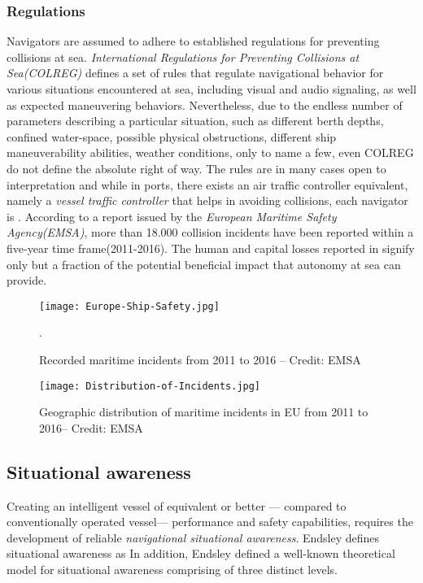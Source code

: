 \subsubsection{Regulations}
Navigators are assumed to adhere to established regulations for preventing collisions at sea. \emph{International Regulations for Preventing Collisions at Sea(COLREG)} defines a set of rules that regulate navigational behavior for various situations encountered at sea, including visual and audio signaling,  as well as expected maneuvering behaviors. Nevertheless, due to the endless number of parameters describing a particular situation, such as different berth depths, confined water-space, possible physical obstructions, different ship maneuverability abilities, weather conditions, only to name a few, even COLREG do not define the absolute right of way. The rules are in many cases open to interpretation and while in ports, there exists an air traffic controller equivalent, namely a \emph{vessel traffic controller} that helps in avoiding collisions, each navigator is \textit{}. According to a report issued by the \emph{European Maritime Safety Agency(EMSA)}, more than 18.000 collision incidents have been reported within a five-year time frame(2011-2016). The human and capital losses reported in  signify only but a fraction of the potential beneficial impact that autonomy at sea can provide.

\begin{figure}[H]
	\centering
	\texttt{[image: Europe-Ship-Safety.jpg]}
	\caption{Recorded maritime incidents from 2011 to 2016 – Credit: EMSA}.
	\label{fig:losses}
\end{figure}


\begin{figure}[H]
	\centering
	\texttt{[image: Distribution-of-Incidents.jpg]}
	\caption{Geographic distribution of maritime incidents in EU from 2011 to 2016– Credit: EMSA}
	\label{fig:distribution}
\end{figure}

\subsection{Situational awareness}
Creating an intelligent vessel of equivalent or better --- compared to conventionally operated vessel--- performance and safety capabilities, requires the development of reliable \emph{navigational situational awareness}. Endsley  \cite{Endsley1995} defines situational awareness as   In addition, Endsley defined a well-known theoretical model for situational awareness  \cite{Endsley2001,Endsley1995} comprising of three distinct levels.

